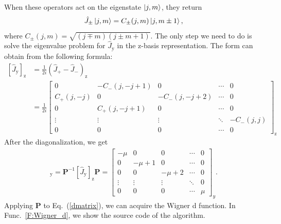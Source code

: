 \documentclass[journal=jacsat,manuscript=article,layout=traditional]{achemso}
\begin{document}
When these operators act on the eigenstate $\ket{j,m}$, they return
\begin{align}
    \label{Eq:OpLadd}
    \hat{J}_\pm\ket{j,m} = C_\pm(j,m) \ket{j,m\pm1}, 
\end{align}
where $C_\pm(j,m) = \sqrt{(j\mp m)(j\pm m+1)}$.
The only step we need to do is solve the eigenvalue problem for $\hat{J}_\mathrm{y}$ in the z-basis representation.
The form can obtain from the following formula:
\begin{align}
    \nonumber
    [\hat{J}_\mathrm{y}]_\mathrm{z} &= \frac{1}{2i}(\hat{J}_+-\hat{J}_-)_\mathrm{z}\\ 
    &= \frac{1}{2i}\begin{bmatrix}
    0 & -C_-(j,-j+1) & 0 & \cdots & 0\\
    C_+(j,-j) & 0 & -C_-(j,-j+2) & \cdots & 0\\
    0 & C_+(j,-j+1) & 0 &\cdots & 0\\
    \vdots & \vdots & \vdots & \ddots & -C_-(j,j)\\
    0 & 0 & 0 & \cdots & 0
    \end{bmatrix}_\mathrm{z}
\end{align}
After the diagonalization, we get
\begin{align}
    [\hat{J}_\mathrm{y}]_\mathrm{y} = \mathbf{P}^{-1}[\hat{J}_\mathrm{y}]_\mathrm{z}\mathbf{P} = \begin{bmatrix}
    -\mu & 0 & 0 & \cdots & 0\\
    0 & -\mu+1 & 0 & \cdots & 0\\
    0 & 0 & -\mu+2 &\cdots & 0\\
    \vdots & \vdots & \vdots & \ddots & 0\\
    0 & 0 & 0 & \cdots & \mu
    \end{bmatrix}_y.
\end{align}
Applying $\mathbf{P}$ to Eq.~(\ref{dmatrix}), we can acquire the Wigner d function.
In Func.~\ref{F:Wigner_d}, we show the source code of the algorithm.


\newpage
\end{document}

